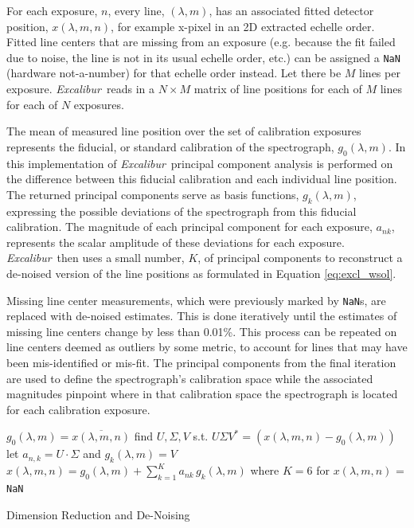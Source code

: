 \documentclass[modern]{aastex63}
\newcommand{\project}[1]{\textsl{#1}}
\newcommand{\name}{\project{Excalibur}}
\newcommand{\code}[1]{\texttt{#1}}
\begin{document}
For each exposure, $n$, every line, $(\lambda,m)$, has an associated fitted detector position, $x(\lambda,m,n)$, for example x-pixel in an 2D extracted echelle order.  Fitted line centers that are missing from an exposure (e.g. because the fit failed due to noise, the line is not in its usual echelle order, etc.) can be assigned a \code{NaN} (hardware not-a-number) for that echelle order instead.  Let there be $M$ lines per exposure.  \name\ reads in a $N \times M$ matrix of line positions for each of $M$ lines for each of $N$ exposures.

The mean of measured line position over the set of calibration exposures represents the fiducial, or standard calibration of the spectrograph, $g_0(\lambda,m)$.  In this implementation of \name\, principal component analysis is performed on the difference between this fiducial calibration and each individual line position.  The returned principal components serve as basis functions,  $g_k(\lambda,m)$, expressing the possible deviations of the spectrograph from this fiducial calibration.  The magnitude of each principal component for each exposure, $a_{nk}$, represents the scalar amplitude of these deviations for each exposure.  \name\ then uses a small number, $K$, of principal components to reconstruct a de-noised version of the line positions as formulated in Equation \ref{eq:excl_wsol}.

Missing line center measurements, which were previously marked by \code{NaN}s, are replaced with de-noised estimates.  This is done iteratively until the estimates of missing line centers change by less than 0.01\%.  This process can be repeated on line centers deemed as outliers by some metric, to account for lines that may have been mis-identified or mis-fit.  The principal components from the final iteration are used to define the spectrograph's calibration space while the associated magnitudes pinpoint where in that calibration space the spectrograph is located for each calibration exposure.

\begin{algorithm}
\SetAlgoLined
{}
{
	$g_0(\lambda,m) = \overline{x(\lambda,m,n)}$\;
	find $U, \Sigma, V$ s.t. $U\Sigma V^* = (x(\lambda,m,n)-g_0(\lambda,m))$\;
	let $a_{n,k} = U\cdot \Sigma$ and $g_k(\lambda,m) = V$\;
	$x(\lambda,m,n) = g_0(\lambda,m) + \sum_{k=1}^K a_{nk}\,g_k(\lambda,m)$ where $K=6$ for $x(\lambda,m,n)$ = \code{NaN}
	}
\caption{Dimension Reduction and De-Noising}
\end{algorithm}
\end{document}
